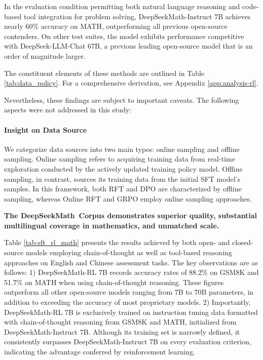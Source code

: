 In the evaluation condition permitting both natural language reasoning and code-based tool integration for problem solving, DeepSeekMath-Instruct 7B achieves nearly 60\% accuracy on MATH, outperforming all previous open-source contenders. On other test suites, the model exhibits performance competitive with DeepSeek-LLM-Chat 67B, a previous leading open-source model that is an order of magnitude larger.

The constituent elements of these methods are outlined in Table \ref{tab:data_policy}. For a comprehensive derivation, see Appendix \ref{app:analysis-rl}.

Nevertheless, these findings are subject to important caveats. The following aspects were not addressed in this study:

\paragraph{Insight on Data Source} We categorize data sources into two main types: online sampling and offline sampling. Online sampling refers to acquiring training data from real-time exploration conducted by the actively updated training policy model. Offline sampling, in contrast, sources its training data from the initial SFT model's samples. In this framework, both RFT and DPO are characterized by offline sampling, whereas Online RFT and GRPO employ online sampling approaches.

\textbf{The DeepSeekMath~Corpus demonstrates superior quality, substantial multilingual coverage in mathematics, and unmatched scale.}

Table \ref{tab:sft_rl_math} presents the results achieved by both open- and closed-source models employing chain-of-thought as well as tool-based reasoning approaches on English and Chinese assessment tasks. The key observations are as follows: 1) DeepSeekMath-RL 7B records accuracy rates of 88.2\% on GSM8K and 51.7\% on MATH when using chain-of-thought reasoning. These figures outperform all other open-source models ranging from 7B to 70B parameters, in addition to exceeding the accuracy of most proprietary models. 2) Importantly, DeepSeekMath-RL 7B is exclusively trained on instruction tuning data formatted with chain-of-thought reasoning from GSM8K and MATH, initialized from DeepSeekMath-Instruct 7B. Although its training set is narrowly defined, it consistently surpasses DeepSeekMath-Instruct 7B on every evaluation criterion, indicating the advantage conferred by reinforcement learning.

